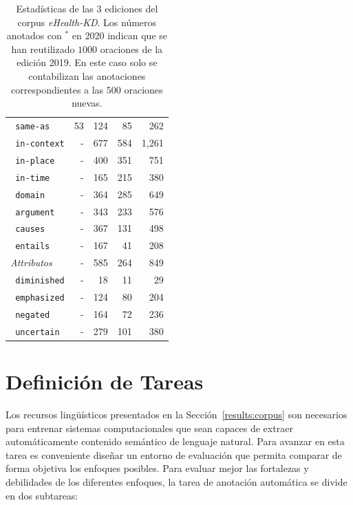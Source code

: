 \begin{table}[tpb]
{\begin{tabular}{lrrrr}
          \texttt{ same-as}         &        53         & 124   &  85           & 262    \\
          \texttt{ in-context}      &         -         & 677   &  584          & 1,261  \\
          \texttt{ in-place}        &         -         & 400   &  351          & 751    \\
          \texttt{ in-time}         &         -         & 165   &  215          & 380    \\
          \texttt{ domain}          &         -         & 364   &  285          & 649    \\
          \texttt{ argument}        &         -         & 343   &  233          & 576    \\
          \texttt{ causes}          &         -         & 367   &  131          & 498    \\
          \texttt{ entails}         &         -         & 167   &  41           & 208    \\
    \midrule
        \textit{Attributos}         &         -         & 585   & 264           & 849    \\
          \texttt{ diminished}      &         -         &  18   & 11            & 29     \\
          \texttt{ emphasized}      &         -         & 124   & 80            & 204    \\
          \texttt{ negated}         &         -         & 164   & 72            & 236    \\
          \texttt{ uncertain}       &         -         & 279   & 101           & 380    \\
    \bottomrule
    \end{tabular}}
    \caption[Estadísticas del corpus \textit{eHealth-KD}.]{Estadísticas de las 3 ediciones del corpus \textit{eHealth-KD}. Los números anotados con ${}^*$ en 2020 indican que se han reutilizado $1000$ oraciones de la edición 2019. En este caso solo se contabilizan las anotaciones correspondientes a las $500$ oraciones nuevas.}
    \label{tab:corpus}
\end{table}

\section{Definición de Tareas}\label{results:tasks}

Los recursos lingüísticos presentados en la Sección~\ref{results:corpus} son necesarios para entrenar sistemas computacionales que sean capaces de extraer automáticamente contenido semántico de lenguaje natural. Para avanzar en esta tarea es conveniente diseñar un entorno de evaluación que permita comparar de forma objetiva los enfoques posibles. Para evaluar mejor las fortalezas y debilidades de los diferentes enfoques, la tarea de anotación automática se divide en dos subtareas:

